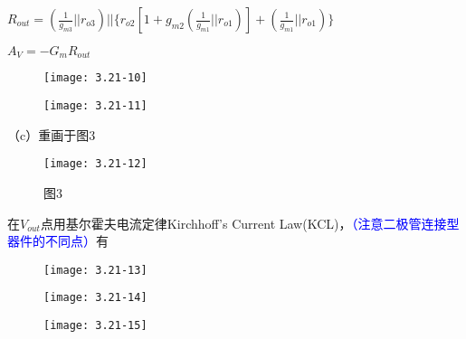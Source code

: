 $R_{out}=(\frac{1}{g_{m3}}||r_{o3})||\{r_{o2}[1+g_{m2}(\frac{1}{g_{m1}}||r_{o1})]+(\frac{1}{g_{m1}}||r_{o1})\}$

$A_V=-G_mR_{out}$

\begin{figure}[H] %
	\begin{minipage}{\linewidth}
		\texttt{[image: 3.21-10]}
	\end{minipage}
\end{figure}

\begin{figure}[H] %
	\begin{minipage}{\linewidth}
		\texttt{[image: 3.21-11]}
	\end{minipage}
\end{figure}

\scalebox{3}{（c）}

（c）重画于图3

\begin{figure}[H] %
	\begin{minipage}{\linewidth}
		\texttt{[image: 3.21-12]}
	\end{minipage}
	\caption*{图3} %
\end{figure}

在$V_{out}$点用基尔霍夫电流定律Kirchhoff’s Current Law(KCL)，\textcolor{blue}{（注意二极管连接型器件的不同点）}有

\begin{figure}[H] %
	\begin{minipage}{\linewidth}
		\texttt{[image: 3.21-13]}
	\end{minipage}
\end{figure}

\begin{figure}[H] %
	\begin{minipage}{\linewidth}
		\texttt{[image: 3.21-14]}
	\end{minipage}
\end{figure}

\begin{figure}[H] %
	\begin{minipage}{\linewidth}
		\texttt{[image: 3.21-15]}
	\end{minipage}
\end{figure}

